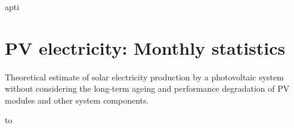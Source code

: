 apti     \documentclass[10pt,a4paper,UTF8]{article}
\begin{document}
{\section{ PV electricity: Monthly statistics }
\setcounter{figure}{0}
\setcounter{table}{0}

\paragraph{} Theoretical estimate of solar electricity production by a photovoltaic system without considering the long-term ageing and performance degradation of PV modules and other system components.%


%


 {\footnotesize 

     \begin{longtabu} to \textwidth{ X[0.5,L]X[0.8,R]X[0.8,R]X[1,R]X[1,R]X[1,R]X[1,R]X[0.5,R] }
    
    
    \caption{ PV power output – long-term averages }
    


\end{longtabu}}}
\end{document}
